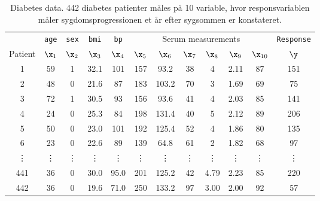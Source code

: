 \begin{table}[H] 
\centering 
\begin{tabular}{cccccccccccc} 
& \texttt{age} & \texttt{sex} & \texttt{bmi} & \texttt{bp} & \multicolumn{6}{c}{Serum measurements} & \texttt{Response} \\
\cline{6-11}
Patient & \(\x_1\) & \(\x_2\) & \(\x_3\) & \(\x_4\) & \(\x_5\) & \(\x_6\) & \(\x_7\) & \(\x_8\) & \(\x_9\) & \(\x_{10}\) & \(\y\) \\
\midrule
1 & 59 &  1 & 32.1 & 101 & 157 & 93.2 & 38 &  4 & 2.11 & 87 & 151 \\
2 & 48 &  0 & 21.6 & 87 & 183 & 103.2 & 70  & 3 & 1.69 & 69  & 75 \\
3 & 72 &  1 & 30.5 & 93 & 156 & 93.6 & 41  & 4 & 2.03 & 85 & 141 \\
4 & 24  & 0 & 25.3 & 84 & 198 & 131.4 & 40 &  5 & 2.12 & 89 & 206 \\
5 & 50  & 0 & 23.0 & 101 & 192 & 125.4 & 52 &  4 & 1.86 & 80 & 135 \\
6 & 23 &  0 & 22.6 & 89 & 139 & 64.8 & 61 &  2 & 1.82 & 68 &  97 \\
\vdots & \vdots & \vdots & \vdots & \vdots & \vdots & \vdots & \vdots & \vdots & \vdots & \vdots & \vdots \\
441 & 36  & 0 & 30.0 & 95.0 & 201 & 125.2 & 42 & 4.79 & 2.23 & 85 & 220 \\
442 & 36 & 0 & 19.6 & 71.0 & 250 & 133.2 & 97 & 3.00 & 2.00 & 92 &  57 \\ \bottomrule
\end{tabular}  
\caption{Diabetes data. 442 diabetes patienter måles på 10 variable, hvor responsvariablen måler sygdomsprogressionen et år efter sygsommen er konstateret.} \label{tab:diabetes} 
\end{table} 